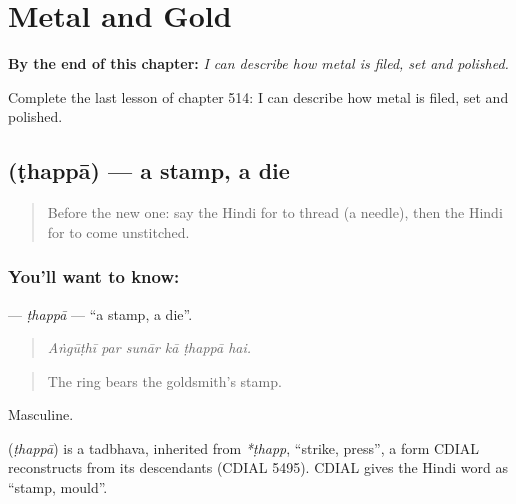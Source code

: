 
\chapter{Metal and Gold}
\label{ch:hi-metal-and-gold}

\begin{chapteropening}
\textbf{By the end of this chapter:} \emph{I can describe how metal is filed, set and polished.}

Complete the last lesson of chapter 514: I can describe how metal is filed, set and polished.
\end{chapteropening}

\section[\texorpdfstring{\hi{ठप्पा} (ṭhappā)}{ठप्पा (ṭhappā)}]{ (ṭhappā) — a stamp, a die}

\label{lesson:HI-C514-thappa}



\begin{quote}
Before the new one: say the Hindi for to thread (a needle), then the Hindi for to come unstitched.
\end{quote}

\subsection*{You'll want to know: }
\textbf{} — \emph{ṭhappā} — \textquotedblleft{}a stamp, a die\textquotedblright{}.

\begin{quote}
     
\end{quote}

\begin{quote}
\emph{Aṅgūṭhī par sunār kā ṭhappā hai.}
\end{quote}

\begin{quote}
The ring bears the goldsmith's stamp.
\end{quote}

Masculine.

\begin{cousinweb}
\textbf{} (\emph{ṭhappā}) is a tadbhava, inherited from \emph{*ṭhapp}, \textquotedblleft{}strike, press\textquotedblright{}, a form CDIAL reconstructs from its descendants (CDIAL 5495). CDIAL gives the Hindi word as \textquotedblleft{}stamp, mould\textquotedblright{}.
\end{cousinweb}

